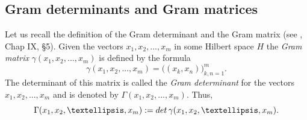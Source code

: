 \documentclass[preprint,12pt]{elsarticle}
\numberwithin{equation}{section}
\begin{document}

\subsection{Gram determinants and Gram matrices}
\begin{df}
\label{d.Gram-det}
Let us recall the definition of
	the Gram  determinant and the Gram  matrix   (see
	\cite{Gan58}, Chap IX, \S 5). Given the  vectors $x_1,x_2,..., x_m$ in some
	Hilbert space $H$ the {\it Gram
		matrix} $\gamma(x_1,x_2,..., x_m)$ is defined  by the formula
$$
\gamma(x_1,x_2,..., x_m)=\big((x_k,x_n)\big)_{k,n=1}^m.
$$
The determinant of this matrix is called the {\it Gram  determinant} for
the vectors $x_1,x_2,..., x_m$ and is denoted by
$\Gamma(x_1,x_2,..., x_m)$.
Thus,
\begin{equation}
	\label{Gram-det}
	\Gamma(x_1,x_2,\dots, x_m):={\rm det}\,\gamma(x_1,x_2,\dots, x_m).
	\end{equation}
\end{df}
\end{document}
